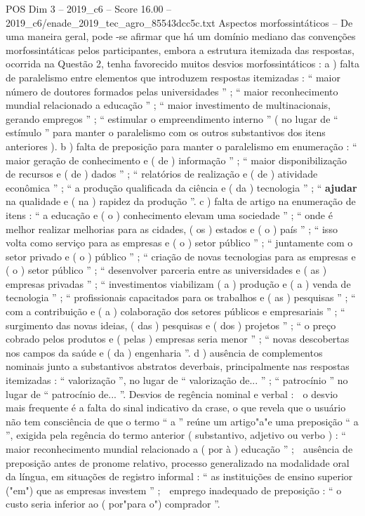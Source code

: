 \begin{textsample}{POS Dim 3 – 2019\_c6 – Score 16.00 – 2019\_c6/enade\_2019\_tec\_agro\_85543dcc5c.txt}
Aspectos morfossintáticos – De uma maneira geral, pode -se afirmar que há um domínio mediano das convenções morfossintáticas pelos participantes, embora a estrutura itemizada das respostas, ocorrida na Questão 2, tenha favorecido muitos desvios morfossintáticos : a ) falta de paralelismo entre elementos que introduzem respostas itemizadas : “ maior número de doutores formados pelas universidades ” ; “ maior reconhecimento mundial relacionado a educação ” ; “ maior investimento de multinacionais, gerando empregos ” ; “ estimular o empreendimento interno ” ( no lugar de “ estímulo ” para manter o paralelismo com os outros substantivos dos itens anteriores ). b ) falta de preposição para manter o paralelismo em enumeração : “ maior geração de conhecimento e ( de ) informação ” ; “ maior disponibilização de recursos e ( de ) dados ” ; “ relatórios de realização e ( de ) atividade econômica ” ; “ a produção qualificada da ciência e ( da ) tecnologia ” ; “ \textbf{ajudar} na qualidade e ( na ) rapidez da produção ”. c ) falta de artigo na enumeração de itens : “ a educação e ( o ) conhecimento elevam uma sociedade ” ; “ onde é melhor realizar melhorias para as cidades, ( os ) estados e ( o ) país ” ; “ isso volta como serviço para as empresas e ( o ) setor público ” ; “ juntamente com o setor privado e ( o ) público ” ; “ criação de novas tecnologias para as empresas e ( o ) setor público ” ; “ desenvolver parceria entre as universidades e ( as ) empresas privadas ” ; “ investimentos viabilizam ( a ) produção e ( a ) venda de tecnologia ” ; “ profissionais capacitados para os trabalhos e ( as ) pesquisas ” ; “ com a contribuição e ( a ) colaboração dos setores públicos e empresariais ” ; “ surgimento das novas ideias, ( das ) pesquisas e ( dos ) projetos ” ; “ o preço cobrado pelos produtos e ( pelas ) empresas seria menor ” ; “ novas descobertas nos campos da saúde e ( da ) engenharia ”. d ) ausência de complementos nominais junto a substantivos abstratos deverbais, principalmente nas respostas itemizadas : “ valorização ”, no lugar de “ valorização de... ” ; “ patrocínio ” no lugar de “ patrocínio de... ”.
Desvios de regência nominal e verbal :  o desvio mais frequente é a falta do sinal indicativo da crase, o que revela que o usuário não tem consciência de que o termo “ a ” reúne um artigo"a"e uma preposição “ a ”, exigida pela regência do termo anterior ( substantivo, adjetivo ou verbo ) : “ maior reconhecimento mundial relacionado a ( por à ) educação ” ;  ausência de preposição antes de pronome relativo, processo generalizado na modalidade oral da língua, em situações de registro informal : “ as instituições de ensino superior ("em") que as empresas investem ” ;  emprego inadequado de preposição : “ o custo seria inferior ao ( por"para o") comprador ”.

\end{textsample}
